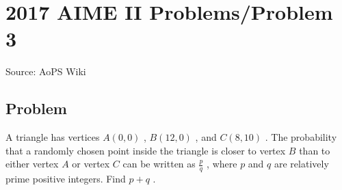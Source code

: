 \documentclass[12pt]{article}
\begin{document}
\section*{{2017 AIME II Problems/Problem 3}}
Source: AoPS Wiki

\subsection*{Problem}
A triangle has vertices $A(0,0)$ , $B(12,0)$ , and $C(8,10)$ . The probability that a randomly chosen point inside the triangle is closer to vertex $B$ than to either vertex $A$ or vertex $C$ can be written as $\frac{p}{q}$ , where $p$ and $q$ are relatively prime positive integers. Find $p+q$ .
\end{document}
